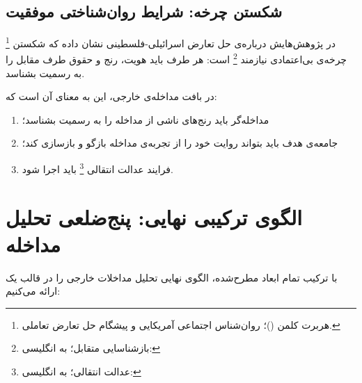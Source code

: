\subsection{شکستن چرخه: شرایط روان‌شناختی موفقیت}
\label{subsec:ch04-break-cycle}

%
\footnote{%
هربرت کلمن ()؛%
روان‌شناس اجتماعی آمریکایی و پیشگام حل تعارض تعاملی.%
}%
در پژوهش‌هایش درباره‌ی حل تعارض اسرائیلی-فلسطینی نشان داده
که شکستن چرخه‌ی بی‌اعتمادی نیازمند
%
\footnote{بازشناسایی متقابل؛ به انگلیسی: }
است: هر طرف باید هویت، رنج و حقوق طرف مقابل را به رسمیت
بشناسد.

در بافت مداخله‌ی خارجی، این به معنای آن است که:
\begin{enumerate}[label=\textbf{\arabic*.}, nosep, rightmargin=1em]
\item مداخله‌گر باید رنج‌های ناشی از مداخله را به رسمیت بشناسد؛
\item جامعه‌ی هدف باید بتواند روایت خود را از تجربه‌ی مداخله
بازگو و بازسازی کند؛
\item فرایند عدالت انتقالی%
\footnote{عدالت انتقالی؛ به انگلیسی:
}
باید اجرا شود.
\end{enumerate}


\section{الگوی ترکیبی نهایی: پنج‌ضلعی تحلیل مداخله}
\label{sec:ch04-pentagon}

با ترکیب تمام ابعاد مطرح‌شده، الگوی نهایی تحلیل مداخلات خارجی
را در قالب یک  ارائه می‌کنیم:

